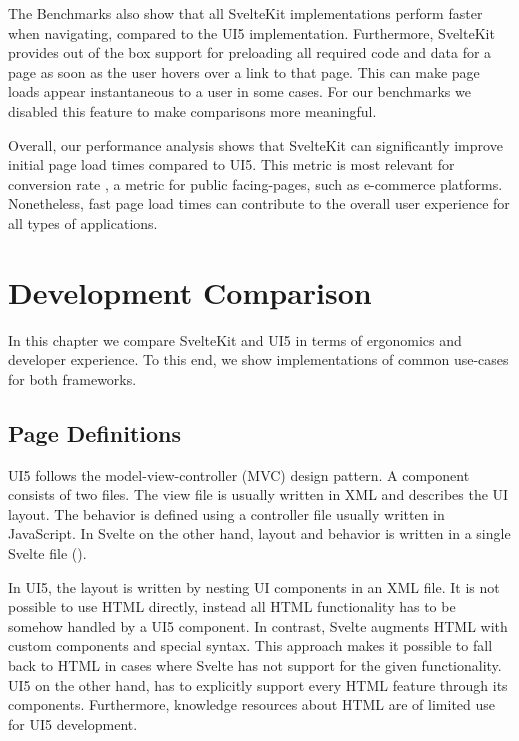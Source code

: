 The Benchmarks also show that all SvelteKit implementations perform faster when navigating, compared to the UI5 implementation. Furthermore, SvelteKit provides out of the box support for preloading all required code and data for a page as soon as the user hovers over a link to that page. This can make page loads appear instantaneous to a user in some cases. For our benchmarks we disabled this feature to make comparisons more meaningful.

Overall, our performance analysis shows that SvelteKit can significantly improve initial page load times compared to UI5. This metric is most relevant for conversion rate \cite{noauthor_load_nodate}, a metric for public facing-pages, such as e-commerce platforms. Nonetheless, fast page load times can contribute to the overall user experience for all types of applications. 

\section{Development Comparison}
In this chapter we compare SvelteKit and UI5 in terms of ergonomics and developer experience. To this end, we show implementations of common use-cases for both frameworks.

\subsection{Page Definitions}

UI5 follows the model-view-controller (MVC) design pattern. A component consists of two files. The view file is usually written in XML and describes the UI layout. The behavior is defined using a controller file usually written in JavaScript. In Svelte on the other hand, layout and behavior is written in a single Svelte file (). 

In UI5, the layout is written by nesting UI components in an XML file. It is not possible to use HTML directly, instead all HTML functionality has to be somehow handled by a UI5 component. In contrast, Svelte augments HTML with custom components and special syntax. This approach makes it possible to fall back to HTML in cases where Svelte has not support for the given functionality. UI5 on the other hand, has to explicitly support every HTML feature through its components. Furthermore, knowledge resources about HTML are of limited use for UI5 development.

